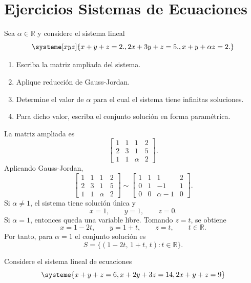\documentclass[11pt,a5]{aleph-examen}
\begin{document}
\section*{Ejercicios Sistemas de Ecuaciones}

\begin{preguntas}
\item
Sea \( \alpha \in \mathbb{R} \) y considere el sistema lineal
\[
\systeme[xyz]{
 x+y+z=2{.},
 2x+3y+ z=5{.},
 x+y+{\alpha} z=2{.}
}
\]

\begin{enumerate}
    \item Escriba la matriz ampliada del sistema.
    \item Aplique reducción de Gauss-Jordan.
    \item Determine el valor de \( \alpha \) para el cual el sistema tiene infinitas soluciones.
    \item Para dicho valor, escriba el conjunto solución en forma paramétrica.
\end{enumerate}

\begin{respuesta}
La matriz ampliada es
\[
    \left[\begin{array}{ccc|c}
        1 & 1 & 1 & 2 \\
        2 & 3 & 1 & 5 \\
        1 & 1 & \alpha & 2
    \end{array}\right].
\]
Aplicando Gauss-Jordan,
\[
    \left[\begin{array}{ccc|c}
        1 & 1 & 1 & 2 \\
        2 & 3 & 1 & 5 \\
        1 & 1 & \alpha & 2
    \end{array}\right]
    \sim
    \left[\begin{array}{ccc|c}
        1 & 1 & 1 & 2 \\
        0 & 1 & -1 & 1 \\
        0 & 0 & \alpha-1 & 0
    \end{array}\right].
\]
Si \(\alpha\neq 1\), el sistema tiene solución única y
\[
    x=1,\qquad y=1,\qquad z=0.
\]
Si \(\alpha=1\), entonces queda una variable libre. Tomando \(z=t\), se obtiene
\[
    x=1-2t,\qquad y=1+t,\qquad z=t,\qquad t\in\mathbb{R}.
\]
Por tanto, para \(\alpha=1\) el conjunto solución es
\[
    S=\{(1-2t,\,1+t,\,t): t\in\mathbb{R}\}.
\]
\end{respuesta}

\item
Considere el sistema lineal de ecuaciones
\[
\systeme{
 x+y+z=6,
 x+2y+3z=14,
 2x+y+z=9
}
\]


\end{preguntas}
\end{document}
